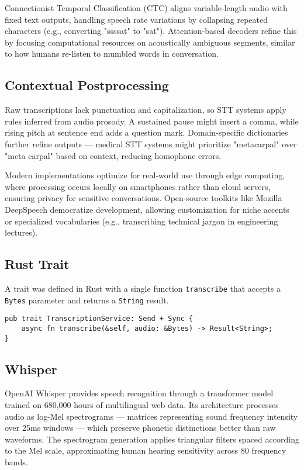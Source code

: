 Connectionist Temporal Classification (CTC) aligns variable-length audio with fixed text outputs,
handling speech rate variations by collapsing repeated characters (e.g., converting "ssssat" to "sat").
Attention-based decoders refine this by focusing computational resources on acoustically ambiguous segments,
similar to how humans re-listen to mumbled words in conversation.

\subsection{Contextual Postprocessing}
Raw transcriptions lack punctuation and capitalization, so STT systems apply rules inferred from audio prosody.
A sustained pause might insert a comma, while rising pitch at sentence end adds a question mark.
Domain-specific dictionaries further refine outputs --- medical STT systems might prioritize "metacarpal" over
"meta carpal" based on context, reducing homophone errors.

Modern implementations optimize for real-world use through edge computing, where processing occurs locally
on smartphones rather than cloud servers, ensuring privacy for sensitive conversations.
Open-source toolkits like Mozilla DeepSpeech democratize development, allowing customization for niche accents
or specialized vocabularies (e.g., transcribing technical jargon in engineering lectures).

\subsection{Rust Trait}
A trait was defined in Rust with a single function \texttt{transcribe} that accepts a \texttt{Bytes} parameter and returns a \texttt{String} result.

\begin{verbatim}
pub trait TranscriptionService: Send + Sync {
    async fn transcribe(&self, audio: &Bytes) -> Result<String>;
}
\end{verbatim}

\subsection{Whisper}
OpenAI Whisper provides speech recognition through a transformer model trained on
680,000 hours of multilingual web data. Its architecture processes audio as
log-Mel spectrograms --- matrices representing sound frequency intensity over 25ms windows ---
which preserve phonetic distinctions better than raw waveforms. The spectrogram
generation applies triangular filters spaced according to the Mel scale, approximating
human hearing sensitivity across 80 frequency bands.

